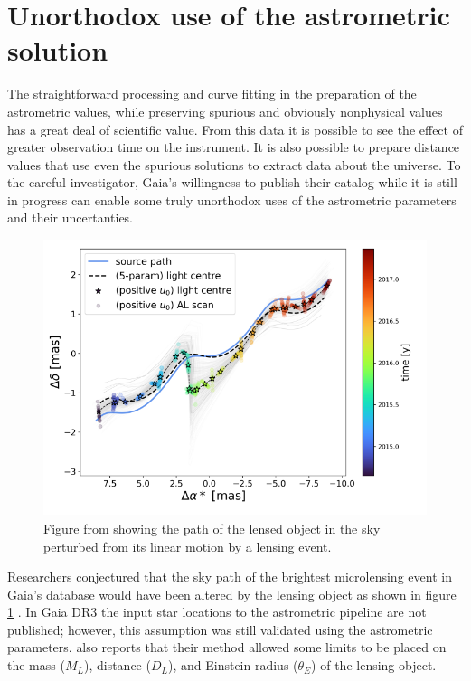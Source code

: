 \documentclass[twocolumn]{aastex631}
\begin{document}
\section{Unorthodox use of the astrometric solution} \label{sec:unorthodox}

The straightforward processing and curve fitting in the preparation of the astrometric values, while preserving spurious and obviously nonphysical values has a great deal of scientific value. From this data it is possible to see the effect of greater observation time on the instrument. It is also possible to prepare distance values that use even the spurious solutions to extract data about the universe. To the careful investigator, Gaia's willingness to publish their catalog while it is still in progress can enable some truly unorthodox uses of the astrometric parameters and their uncertanties.

\begin{figure}
	\includegraphics[width=\columnwidth]{microlensingpath.png}
	\caption{Figure from \cite{jablonskaThere2022} showing the path of the lensed object in the sky perturbed from its linear motion by a lensing event.}
	\label{fig:starpath}
\end{figure}

Researchers conjectured that the sky path of the brightest microlensing event in Gaia's database would have been altered by the lensing object as shown in figure \ref{fig:starpath} \citep{jablonskaThere2022} . In Gaia DR3 the input star locations to the astrometric pipeline are not published; however, this assumption was still validated using the astrometric parameters. \cite{jablonskaThere2022} also reports that their method allowed some limits to be placed on the mass ($M_L$), distance ($D_L$), and Einstein radius ($\theta_E$) of the lensing object. 
\end{document}
